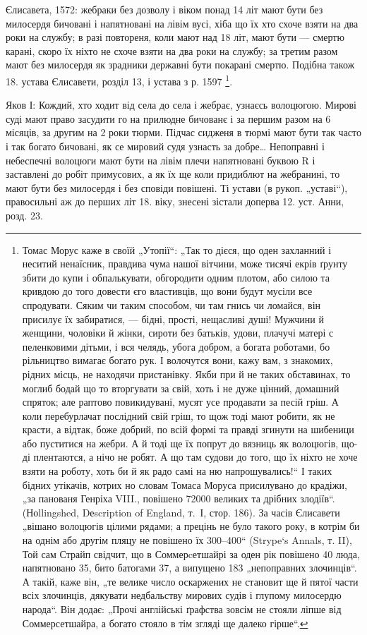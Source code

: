 Єлисавета, 1572: жебраки без дозволу і віком понад 14 літ мают бути без
милосердя бичовані і напятновані на лівім вусі, хіба що їх хто схоче взяти на
два роки на службу; в разі повтореня, коли мают над 18 літ, мают бути — смертю
карані, скоро їх ніхто не схоче взяти на два роки на службу; за третим разом
мают без милосердя як зрадники державні бути покарані смертю. Подібна також 18.
устава Єлисавети, розділ 13, і устава з р. 1597 \footnote{
Томас Морус каже в своїй „Утопії“: „Так то дієся, що оден захланний і неситий
ненаїсник, правдива чума нашої вітчини, може тисячі екрів ґрунту збити до купи
і обпалькувати, обгородити одним плотом, або силою та кривдою до того довести
єго властивців, що вони будут мусіли все спродувати. Сяким чи таким способом,
чи там гнись чи ломайся, він присилує їх забиратися, — бідні, прості, нещасливі
душі! Мужчини й женщини, чоловіки й жінки, сироти без батьків, удови, плачучі
матері с пеленковими дітьми, і вся челядь, убога добром, а богата
роботами, бо рільництво вимагає богато рук. І волочутся вони, кажу вам,
з знакомих, рідних місць, не находячи пристанівку. Якби при й не таких
обставинах, то моглиб бодай що то вторгувати за свій, хоть і не дуже
цінний, домашний спряток; але раптово повикидувані, мусят усе продавати
за песій гріш. А коли перебурлачат послідний свій гріш, то щож
тоді мают робити, як не красти, а відтак, боже добрий, по всій формі та
правді згинути на шибеници або пуститися на жебри. А й тоді ще їх
попрут до вязниць як волоцюгів, що-ді плентаются, а нічо не робят.
А що там судови до того, що їх ніхто не хоче взяти на роботу, хоть би
й як радо самі на ню напрошувались!“ І таких бідних утікачів, котрих
но словам Томаса Моруса присилувано до крадіжи, „за панованя Генріха
VIII., повішено 72000 великих та дрібних злодіїв“. (Ноllingshed, Dеscription
of England, т.~І, стор. 186). За часів Єлисавети „вішано волоцюгів
цілими рядами; а прецінь не було такого року, в котрім би на
однім або другім пляцу не повішено їх 300--400“ (Strype`s Annals, т. II),
Той сам Страйп свідчит, що в Соммерcетшайрі за оден рік повішено 40
люда, напятновано 35, бито батогами 37, а випущено 183 „непоправних
злочинців“. А такій, каже він, „те велике число оскаржених не становит
ще й пятої части всіх злочинців, дякувати недбальству мирових судів
і глупому милосердю народа“. Він додає: „Прочі англійські ґрафства
зовсім не стояли ліпше від Соммерсетшайра, а богато стояло в тім згляді
ще далеко гірше“.
}.

Яков І: Кождий, хто ходит від села до села і жебрає,
узнаєсь волоцюгою. Мирові суді мают право засудити го на
прилюдне бичованє і за першим разом на 6 місяців, за
другим на 2 роки тюрми. Підчас сидженя в тюрмі мают
бути так часто і так богато бичовані, як се мировий судя
узнасть за добре\dots{} Непоправні і небеспечні волоцюги мают
бути на лівім плечи напятновані буквою R і заставлені до
робіт примусових, а як їх ще коли придиблют на жебранині,
то мают бути без милосердя і без сповіди повішені. Ті устави
(в рукоп. „уставі“), правосильні аж до перших літ 18. віку,
знесені зістали доперва 12. уст. Анни, розд. 23.

